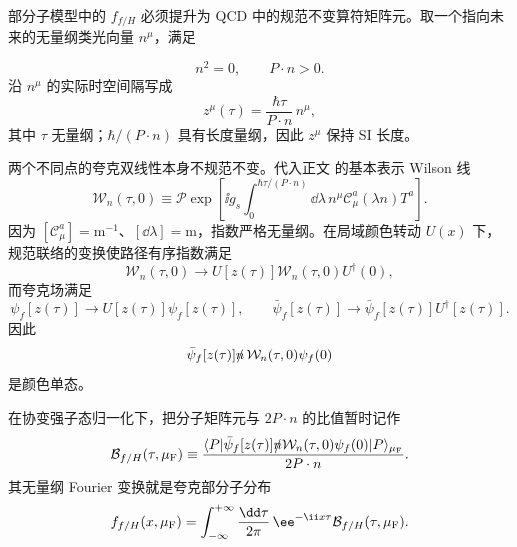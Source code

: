 \begin{derivation}[双局域部分子算符中的规范连接]
部分子模型中的 $f_{f/H}$ 必须提升为 QCD 中的规范不变算符矩阵元。取一个指向未来的无量纲类光向量 $n^\mu$，满足

\begin{equation*}
 n^2=0,
 \qquad P\cdot n>0.
\end{equation*}
沿 $n^\mu$ 的实际时空间隔写成
\begin{equation*}
 z^\mu(\tau)
 =\frac{\hbar\tau}{P\cdot n}\,n^\mu,
\end{equation*}
其中 $\tau$ 无量纲；$\hbar/(P\cdot n)$ 具有长度量纲，因此 $z^\mu$ 保持 SI 长度。

两个不同点的夸克双线性本身不规范不变。代入正文 的基本表示 Wilson 线
\begin{equation*}
 \mathcal W_n(\tau,0)
 \equiv\mathcal P\exp\left[
 \ii g_s\int_0^{\hbar\tau/(P\cdot n)}\dd\lambda\,
 n^\mu\mathscr C_\mu^a(\lambda n)T^a
 \right].
\end{equation*}
因为 $[\mathscr C_\mu^a]=\mathrm{m^{-1}}$、$[\dd\lambda]=\mathrm m$，指数严格无量纲。在局域颜色转动 $U(x)$ 下，规范联络的变换使路径有序指数满足
\begin{equation*}
 \mathcal W_n(\tau,0)
 \longrightarrow
 U[z(\tau)]\mathcal W_n(\tau,0)U^\dagger(0),
\end{equation*}
而夸克场满足
\begin{equation*}
 \psi_f[z(\tau)]\to U[z(\tau)]\psi_f[z(\tau)],
 \qquad
 \bar\psi_f[z(\tau)]\to\bar\psi_f[z(\tau)]U^\dagger[z(\tau)].
\end{equation*}
因此
\begin{equation*}
 \bar\psi_f[z(\tau)]\slashed n\,
 \mathcal W_n(\tau,0)\psi_f(0)
\end{equation*}
是颜色单态。

在协变强子态归一化下，把分子矩阵元与 $2P\cdot n$ 的比值暂时记作
\begin{equation*}
 \mathcal B_{f/H}(\tau,\mu_{\rm F})
 \equiv
 \frac{\langle P|
 \bar\psi_f[z(\tau)]\slashed n\mathcal W_n(\tau,0)\psi_f(0)
 |P\rangle_{\mu_{\rm F}}}
 {2P\cdot n}.
\end{equation*}
其无量纲 Fourier 变换就是夸克部分子分布
\begin{equation*}
 f_{f/H}(x,\mu_{\rm F})
 =\int_{-\infty}^{+\infty}
 \frac{\dd\tau}{2\pi}\,
 \ee^{-\ii x\tau}
 \mathcal B_{f/H}(\tau,\mu_{\rm F}).
\end{equation*}
\end{derivation}

